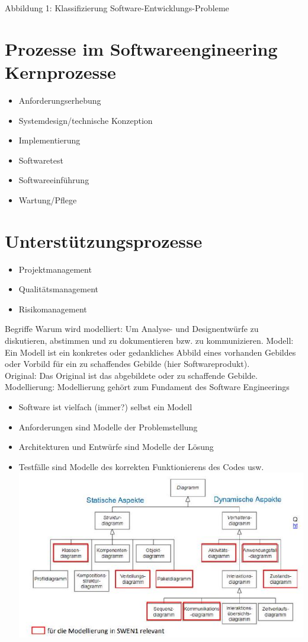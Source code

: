 Abbildung 1: Klassifizierung Software-Entwicklungs-Probleme

\section*{Prozesse im Softwareengineering Kernprozesse}
\begin{itemize}
  \item Anforderungserhebung
  \item Systemdesign/technische Konzeption
  \item Implementierung
  \item Softwaretest
  \item Softwareeinführung
  \item Wartung/Pflege
\end{itemize}

\section*{Unterstützungsprozesse}
\begin{itemize}
  \item Projektmanagement
  \item Qualitätsmanagement
  \item Risikomanagement
\end{itemize}

Begriffe Warum wird modelliert: Um Analyse- und Designentwürfe zu diskutieren, abstimmen und zu dokumentieren bzw. zu kommunizieren. Modell: Ein Modell ist ein konkretes oder gedankliches Abbild eines vorhanden Gebildes oder Vorbild für ein zu schaffendes Gebilde (hier Softwareprodukt).\\
Original: Das Original ist das abgebildete oder zu schaffende Gebilde.\\
Modellierung: Modellierung gehört zum Fundament des Software Engineerings

\begin{itemize}
  \item Software ist vielfach (immer?) selbst ein Modell
  \item Anforderungen sind Modelle der Problemstellung
  \item Architekturen und Entwürfe sind Modelle der Lösung
  \item Testfälle sind Modelle des korrekten Funktionierens des Codes usw.\\
\includegraphics[width=\textwidth]{images/2024_12_29_0d1d7b5551ea1b4b41bdg-01(1)}
\end{itemize}

